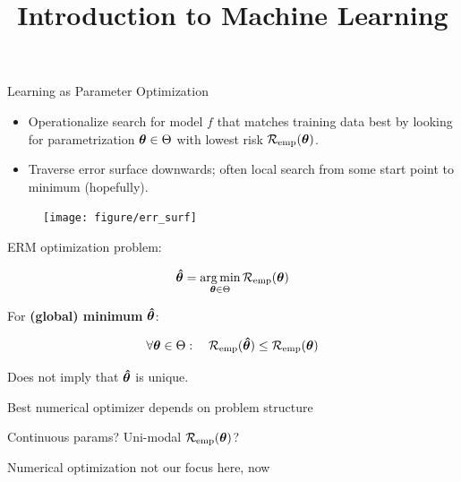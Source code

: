 \documentclass[11pt,compress,t,notes=noshow, xcolor=table]{beamer}
\title{Introduction to Machine Learning}
\begin{document}


\begin{vbframe}{Learning as Parameter Optimization}
  \begin{itemize}
    \item Operationalize search for model $f$ that matches
    training data best by looking for parametrization $\bm{\theta} \in \Theta$
    with lowest risk $\mathcal{R}_{\text{emp}}(\bm{\theta})$.
    \item Traverse error surface downwards; often local search from some start point to minimum (hopefully).
  \end{itemize}
  
  \vfill
  
  \begin{figure}[!b]
    \texttt{[image: figure/err\_surf]}
  \end{figure}
  
  \framebreak
  
  ERM optimization problem:
  
\[
  \bm{\hat\theta}  = \mathop{\mathrm{arg\,min}}_{\bm{\theta} \in \Theta} \mathcal{R}_{\text{emp}}(\bm{\theta}) 
\]
  
  For \textbf{(global) minimum} $\bm{\hat\theta}$:
  
\[
  \forall \bm{\theta} \in \Theta :\quad \mathcal{R}_{\text{emp}}(\bm{\hat\theta}) \leq \mathcal{R}_{\text{emp}}(\bm{\theta}) 
\]
  
  Does not imply that $\bm{\hat\theta}$ is unique.
  \vfill
  
  \begin{itemizeM}
    \item Best numerical optimizer depends on problem structure
    \item Continuous params? Uni-modal $\mathcal{R}_{\text{emp}}(\bm{\theta})$? 
    \item Numerical optimization not our focus here, now
  \end{itemizeM}
  
\end{vbframe}
\end{document}
